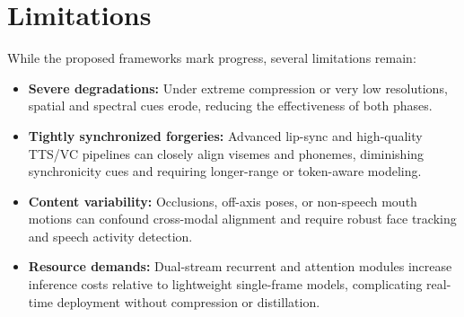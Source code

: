 \section{Limitations}
While the proposed frameworks mark progress, several limitations remain:
\begin{itemize}
    \item \textbf{Severe degradations:} Under extreme compression or very low resolutions, spatial and spectral cues erode, reducing the effectiveness of both phases.
    \item \textbf{Tightly synchronized forgeries:} Advanced lip-sync and high-quality TTS/VC pipelines can closely align visemes and phonemes, diminishing synchronicity cues and requiring longer-range or token-aware modeling.
    \item \textbf{Content variability:} Occlusions, off-axis poses, or non-speech mouth motions can confound cross-modal alignment and require robust face tracking and speech activity detection.
    \item \textbf{Resource demands:} Dual-stream recurrent and attention modules increase inference costs relative to lightweight single-frame models, complicating real-time deployment without compression or distillation.
\end{itemize}

